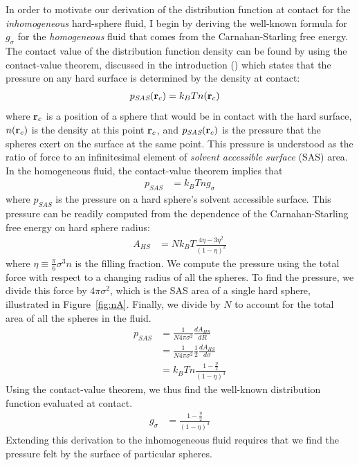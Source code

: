 In order to motivate our derivation of the distribution function at
contact for the \emph{inhomogeneous} hard-sphere fluid, I begin by
deriving the well-known formula for $g_\sigma$ for the
\emph{homogeneous} fluid that comes from the Carnahan-Starling free
energy.  The contact value of the distribution function density can be
found by using the contact-value theorem, discussed in the
introduction () which states
that the pressure on any hard surface is determined by the density at
contact:
\begin{align}
  p_{\textit{SAS}}(\textbf{r}_c) &= k_BT n(\textbf{r}_c)
\end{align}
where $\textbf{r}_c$ is a position of a sphere that would be in contact with
the hard surface, $n(\textbf{r}_c)$ is the density at this point $\textbf{r}_c$, and
$p_{\textit{SAS}}(\textbf{r}_c)$ is the pressure that the spheres
exert on the surface at the same point.  This pressure is
understood as the ratio of force to an infinitesimal element of
\emph{solvent accessible surface} (SAS) area.
%
In the homogeneous fluid, the contact-value theorem implies that
\begin{align}
  p_{\textit{SAS}} &= k_BT n g_\sigma
\end{align}
where $p_{SAS}$ is the pressure on a hard sphere's solvent accessible surface.
This pressure can be
readily computed from the dependence of the Carnahan-Starling free
energy on hard sphere radius:
\begin{align}
  A_{HS} &= Nk_BT \frac{4\eta - 3\eta^2}{(1-\eta)^2}
\end{align}
where $\eta \equiv \frac{\pi}{6} \sigma^3 n$ is the filling fraction.
We compute the pressure using the total force with
respect to a changing radius of all the spheres.
To find the pressure, we divide this force by $4\pi \sigma^2$, which
is the SAS area of a single hard sphere, illustrated in Figure~\ref{fig:nA}.
Finally, we divide by $N$ to account for the total area of all the
spheres in the fluid.
\begin{align}
  p_{\textit{SAS}} &= \frac{1}{N 4\pi \sigma^2} \frac{dA_{HS}}{dR} \\
  &= \frac{1}{N 4\pi \sigma^2} \frac12 \frac{dA_{HS}}{d\sigma} \\
  &= k_BT n \frac{1 - \frac{\eta}2}{(1-\eta)^3}
\end{align}
Using the contact-value theorem, we thus find the well-known
distribution function evaluated at contact.
\begin{align}
  g_\sigma &= \frac{1 - \frac{\eta}2}{(1-\eta)^3} \label{eq:cs-g}
\end{align}
Extending this derivation to the inhomogeneous fluid requires that we
find the pressure felt by the surface of particular spheres.


